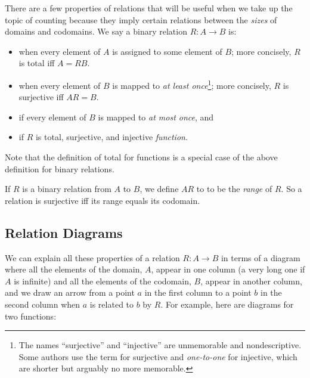 There are a few properties of relations that will be useful when we take
up the topic of counting because they imply certain relations between the
\emph{sizes} of domains and codomains.  We say a binary relation $R : A
\to B$ is:

\begin{itemize}

\item {} when every element of $A$ is assigned to some element of
  $B$; more concisely, $R$ is total iff $A=RB$.

\item {} when every element of $B$ is mapped to \textit{at
least once}\footnote{
The names ``surjective'' and ``injective'' are unmemorable and
nondescriptive.  Some authors use the term  for surjective and
\emph{one-to-one} for injective, which are shorter but arguably no more
memorable.}; more concisely, $R$ is surjective iff $AR=B$.

\item {} if every element of $B$ is mapped to \textit{at
most once}, and

\item {} if $R$ is total, surjective, and injective
  \emph{function}.

\end{itemize}

Note that the definition of total for functions is a special case of the
above definition for binary relations.

If $R$ is a binary relation from $A$ to $B$, we define $AR$ to to be the
\emph{range} of $R$.  So a relation is surjective iff its range equals its
codomain.

\subsection{Relation Diagrams}
We can explain all these properties of a relation $R:A \to B$ in terms of
a diagram where all the elements of the domain, $A$, appear in one column
(a very long one if $A$ is infinite) and all the elements of the codomain,
$B$, appear in another column, and we draw an arrow from a point $a$ in
the first column to a point $b$ in the second column when $a$ is related
to $b$ by $R$.  For example, here are diagrams for two functions:

